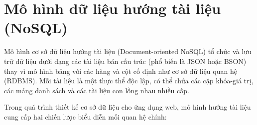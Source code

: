 





\section{Mô hình dữ liệu hướng tài liệu (NoSQL)}

Mô hình cơ sở dữ liệu hướng tài liệu (Document-oriented NoSQL) tổ chức và lưu trữ dữ liệu dưới dạng các tài liệu bán cấu trúc (phổ biến là JSON hoặc BSON) thay vì mô hình bảng với các hàng và cột cố định như cơ sở dữ liệu quan hệ (RDBMS). Mỗi tài liệu là một thực thể độc lập, có thể chứa các cặp khóa-giá trị, các mảng danh sách và các tài liệu con lồng nhau nhiều cấp.

Trong quá trình thiết kế cơ sở dữ liệu cho ứng dụng web, mô hình hướng tài liệu cung cấp hai chiến lược biểu diễn mối quan hệ chính:

